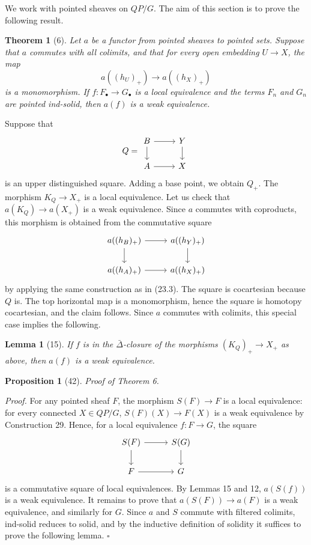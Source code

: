 \documentclass[11pt]{article}
\theoremstyle{deligne}
\newtheorem*{theorem*}{Theorem}
\newtheorem*{proposition*}{Proposition}
\newtheorem*{lemma*}{Lemma}
\newenvironment{proofdel}{\noindent\textit{Proof.}}{\hfill$\square$}
\begin{document}
We work with pointed sheaves on \(QP/G\). The aim of this section is to prove the following result.

\begin{theorem*}[6]
Let \(a\) be a functor from pointed sheaves to pointed sets. Suppose that \(a\) commutes with all colimits, and that for every open embedding \(U\to X\), the map
\[
a((h_U)_+)\longrightarrow a((h_X)_+)
\]
is a monomorphism. If \(f:F_\bullet\to G_\bullet\) is a local equivalence and the terms \(F_n\) and \(G_n\) are pointed ind-solid, then \(a(f)\) is a weak equivalence.
\end{theorem*}

Suppose that
\[
Q=\begin{tikzcd}[column sep=2.5em,row sep=1.6em,baseline=(current bounding box.center)]
B \arrow[r] \arrow[d] & Y \arrow[d]\\
A \arrow[r] & X
\end{tikzcd}
\]
is an upper distinguished square. Adding a base point, we obtain \(Q_+\). The morphism \(K_Q\to X_+\) is a local equivalence. Let us check that \(a(K_Q)\to a(X_+)\) is a weak equivalence. Since \(a\) commutes with coproducts, this morphism is obtained from the commutative square
\[
\begin{tikzcd}[column sep=2.6em,row sep=1.8em]
a((h_B)_+) \arrow[r] \arrow[d] & a((h_Y)_+) \arrow[d]\\
a((h_A)_+) \arrow[r] & a((h_X)_+)
\end{tikzcd}
\]
by applying the same construction as in (23.3). The square is cocartesian because \(Q\) is. The top horizontal map is a monomorphism, hence the square is homotopy cocartesian, and the claim follows. Since \(a\) commutes with colimits, this special case implies the following.

\begin{lemma*}[15]
If \(f\) is in the \(\bar\Delta\)-closure of the morphisms \((K_Q)_+\to X_+\) as above, then \(a(f)\) is a weak equivalence.
\end{lemma*}

\begin{proposition*}[42]
Proof of Theorem 6.
\end{proposition*}

\begin{proofdel}
For any pointed sheaf \(F\), the morphism \(S(F)\to F\) is a local equivalence: for every connected \(X\in QP/G\), \(S(F)(X)\to F(X)\) is a weak equivalence by Construction 29. Hence, for a local equivalence \(f:F\to G\), the square
\[
\begin{tikzcd}[column sep=2.8em,row sep=1.8em]
S(F) \arrow[r] \arrow[d] & S(G) \arrow[d]\\
F \arrow[r] & G
\end{tikzcd}
\]
is a commutative square of local equivalences. By Lemmas 15 and 12, \(a(S(f))\) is a weak equivalence. It remains to prove that \(a(S(F))\to a(F)\) is a weak equivalence, and similarly for \(G\). Since \(a\) and \(S\) commute with filtered colimits, ind-solid reduces to solid, and by the inductive definition of solidity it suffices to prove the following lemma.
\end{proofdel}
\end{document}
